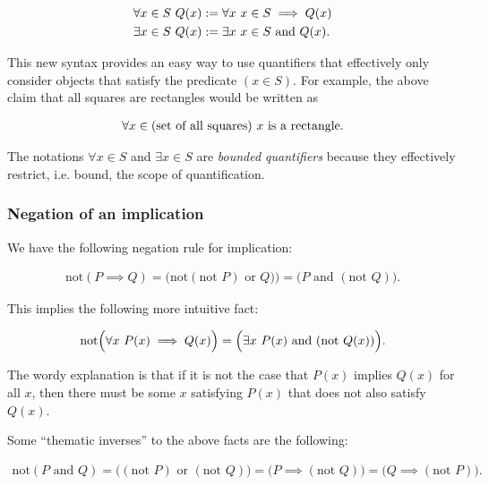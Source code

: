 \begin{align*}
    &\forall x \in S \text{ } Q(x) := \forall x \text{ } x \in S \implies Q(x) \\
    &\exists x \in S \text{ } Q(x) := \exists x \text{ } x \in S \text{ and } Q(x).
\end{align*}

This new syntax provides an easy way to use quantifiers that effectively only consider objects that satisfy the predicate $(x \in S)$. For example, the above claim that all squares are rectangles would be written as 

\begin{align*}
    \forall x \in (\text{set of all squares}) \text{ } \text{$x$ is a rectangle}.
\end{align*}

The notations $\forall x \in S$ and $\exists x \in S$ are \textit{bounded quantifiers} because they effectively restrict, i.e. bound, the scope of quantification. 

\subsubsection*{Negation of an implication}

We have the following negation rule for implication:

\begin{align*}
    \text{not}(P \implies Q) = \Big(\text{not}(\text{not } P) \text{ or } Q)\Big) = \Big(P \text{ and } (\text{not } Q)\Big).
\end{align*}

This implies the following more intuitive fact:

\begin{align*}
    \text{not}\Big(\forall x \text{ } P(x) \implies Q(x) \Big) = \Big(\exists x \text{ } P(x) \text{ and } (\text{not } Q(x))\Big).
\end{align*}

The wordy explanation is that if it is not the case that $P(x)$ implies $Q(x)$ for all $x$, then there must be some $x$ satisfying $P(x)$ that does not also satisfy $Q(x)$.

Some ``thematic inverses'' to the above facts are the following:

\begin{align*}
    \text{not}(P \text{ and } Q) = \Big((\text{not } P) \text{ or } (\text{not } Q)\Big) = \Big(P \implies (\text{not } Q)\Big) = \Big(Q \implies (\text{not } P)\Big).
\end{align*}

